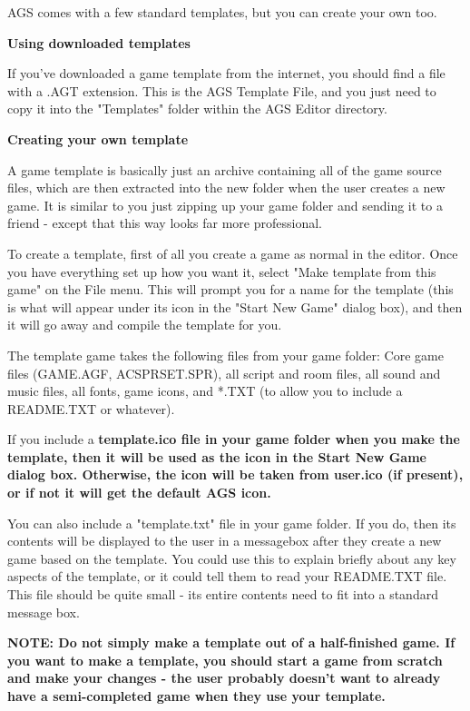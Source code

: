 AGS comes with a few standard templates, but you can create your own too.

\bf{Using downloaded templates}

If you've downloaded a game template from the internet, you should find a file with
a .AGT extension. This is the AGS Template File, and you just need to copy it into
the "Templates" folder within the AGS Editor directory.

\bf{Creating your own template}

A game template is basically just an archive containing all of the game source files,
which are then extracted into the new folder when the user creates a new game. It is
similar to you just zipping up your game folder and sending it to a friend - except that
this way looks far more professional.

To create a template, first of all you create a game as normal in the editor. Once you
have everything set up how you want it, select "Make template from this game" on the File
menu. This will prompt you for a name for the template (this is what will appear under its
icon in the "Start New Game" dialog box), and then it will go away and compile the template
for you.

The template game takes the following files from your game folder:
Core game files (GAME.AGF, ACSPRSET.SPR), all script and room files, all sound and music
files, all fonts, game icons, and *.TXT (to allow you to include a README.TXT or whatever).

If you include a  \bf{template.ico} file in your game folder when you make the template,
then it will be used as the icon in the Start New Game dialog box. Otherwise, the icon will
be taken from user.ico (if present), or if not it will get the default AGS icon.

You can also include a "template.txt" file in your game folder. If you do, then its contents
will be displayed to the user in a messagebox after they create a new game based on the
template. You could use this to explain briefly about any key aspects of the template, or
it could tell them to read your README.TXT file. This file should be quite small - its entire
contents need to fit into a standard message box.

\bf{NOTE:} Do not simply make a template out of a half-finished game. If you want to make
a template, you should start a game from scratch and make your changes - the user probably
doesn't want to already have a semi-completed game when they use your template.



